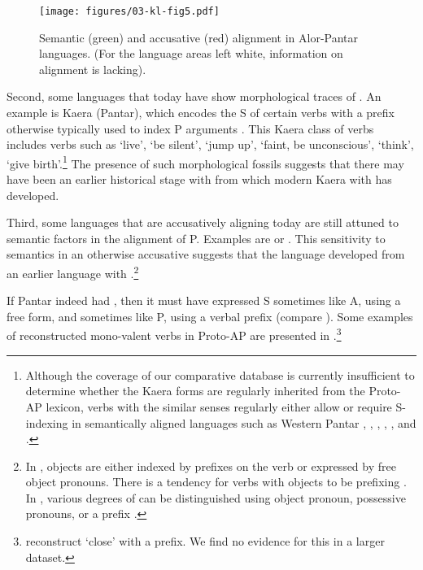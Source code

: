 \documentclass[output=paper]{LSP/langsci}
\begin{document}
\begin{figure}
\texttt{[image: figures/03-kl-fig5.pdf]}
\caption{Semantic (green) and accusative (red) alignment in Alor-Pantar languages. (For the language areas left white, information on alignment is lacking).}
\label{03-kl-fig:5}
\end{figure}

Second, some languages that today have  show morphological traces of . An example is Kaera (Pantar), which encodes the S of certain  verbs with a prefix otherwise typically used to index P arguments \citep[135--136]{Klamer2014Kaera}. This Kaera class of verbs includes verbs such as `live', `be silent', `jump up', `faint, be unconscious', `think', `give birth'.\footnote{Although the coverage of our comparative database is currently insufficient to determine whether the Kaera forms are regularly inherited from the Proto-AP lexicon, verbs with the similar senses regularly either allow or require S-indexing in semantically aligned languages such as Western Pantar \citep{Holton2014Western}, 
 \citep{Baird2008Grammar},  \citep{Kratochvil2007Grammar,Kratochvil2011Transitivity}, 
 \citep{Schapper2014Kamang},  \citep{Kratochvil2014Sawila}, and  \citep{Schapperetal2017Relatedness}.} The presence of such morphological fossils suggests that there may have been an earlier historical stage with  from which modern Kaera with  has developed.

Third, some languages that are accusatively aligning today are still attuned to semantic factors in the alignment of P. Examples are  \citep{Haan2001Grammar,Robinsonetal2014Adang} or   \citep{Steinhauer2014Blagar}. This sensitivity to semantics in an otherwise accusative  suggests that the language developed from an earlier language with .\footnote{In , objects are either indexed by prefixes on the verb or expressed by free object pronouns. There is a tendency for verbs with  objects to be prefixing \citep{Feddenetal2013Feddenetal}. In , various degrees of  can be
 distinguished using object pronoun, possessive pronouns, or a prefix
 \citep[167, 189]{Steinhauer2014Blagar}.}

If  Pantar indeed had , then it must have expressed  S sometimes like A, using a free form, and sometimes like P, using a verbal prefix (compare ). Some examples of reconstructed mono-valent verbs in Proto-AP are presented
in .\footnote{\citet[75]{Holtonetal2017Internal} reconstruct ‘close’ with a prefix. We find no evidence for this in a larger dataset.}
\end{document}

